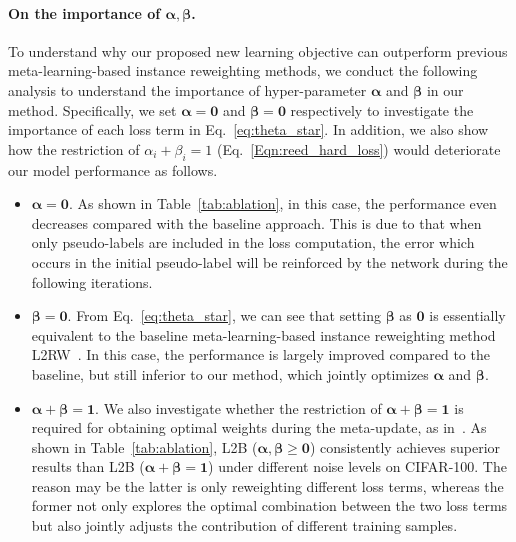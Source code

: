 \documentclass{article}
\begin{document}
\paragraph{On the importance of $\boldsymbol{\alpha}, \boldsymbol{\beta}$.} To understand why our proposed new learning objective can outperform previous meta-learning-based instance reweighting methods, we conduct the following analysis to understand the importance of hyper-parameter $\boldsymbol{\alpha}$ and $\boldsymbol{\beta}$ in our method. Specifically, we set $\boldsymbol{\alpha} = \boldsymbol{0}$ and $\boldsymbol{\beta} = \boldsymbol{0}$ respectively to investigate the importance of each loss term in Eq.~\eqref{eq:theta_star}.
In addition, we also show how the restriction of $\alpha_i + \beta_i = 1$ (Eq.~\eqref{Eqn:reed_hard_loss}) would deteriorate our model performance as follows. 
\begin{itemize}
   \item $\boldsymbol{\alpha} = \boldsymbol{0}$. As shown in Table~\ref{tab:ablation}, in this case, the performance even decreases compared with the baseline approach. 
   This is due to that when only pseudo-labels are included in the loss computation, the error which occurs in the initial pseudo-label will be reinforced by the network during the following iterations.
   \item $\boldsymbol{\beta} = \boldsymbol{0}$. From Eq.~\eqref{eq:theta_star}, we can see that setting $\boldsymbol{\beta}$ as $\boldsymbol{0}$  is essentially equivalent to the baseline meta-learning-based instance reweighting method L2RW~\cite{ren2018learning}.
   In this case, the performance is largely improved compared to the baseline, but still inferior to our method, which jointly optimizes $\boldsymbol{\alpha}$ and $\boldsymbol{\beta}$.
    
    
   \item  $\boldsymbol{\alpha} + \boldsymbol{\beta} = \boldsymbol{1}$. We also investigate whether the restriction of $\boldsymbol{\alpha} + \boldsymbol{\beta} = \boldsymbol{1}$ is required for obtaining optimal weights during the meta-update, as in~\cite{zhang2020distilling}. 
   As shown in Table~\ref{tab:ablation}, L2B ($\boldsymbol{\alpha}, \boldsymbol{\beta} \ge \boldsymbol{0}$) consistently achieves superior results than L2B ($\boldsymbol{\alpha} + \boldsymbol{\beta} = \boldsymbol{1}$) under different noise levels on CIFAR-100. The reason may be the latter is only reweighting different loss terms, whereas the former not only explores the optimal combination between the two loss terms but also jointly adjusts the contribution of different training samples.
\end{itemize}
  
\end{document}
